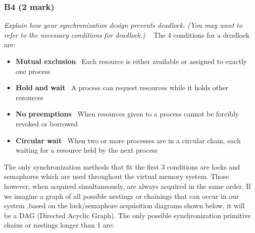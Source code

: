 \documentclass{report}
\newcommand{\question}[1]{\textit{#1} \ }
\newcommand{\bullpara}[2]{\item \textbf{#1} \ #2}
\newcommand{\compitem}[1]{\begin{itemize}\setlength\itemsep{-0.1em}#1\end{itemize}}
\begin{document}
			\subsubsection*{B4 (2 mark)}
				\question{Explain how your synchronization design prevents deadlock.
				(You may want to refer to the necessary conditions for deadlock.)}
				The 4 conditions for a deadlock are:
				\compitem{
					\bullpara{Mutual exclusion}{Each resource is either available or assigned to exactly one process}
					\bullpara{Hold and wait}{A process can request resources while it holds other resources}
					\bullpara{No preemptions}{When resources given to a process cannot be forcibly revoked or borrowed}
					\bullpara{Circular wait}{When two or more processes are in a circular chain, each waiting for a resource held by the next process}
				}
				The only synchronization methods that fit the first 3 conditions are locks and semaphores which are used throughout the virtual memory system.
				Those however, when acquired simultaneously, are always acquired in the same order. If we imagine a graph of all possible
				nestings or chainings that can occur in our system ,based on the lock/semaphore acquisition diagrams shown below, it will be a DAG (Directed Acyclic Graph).
				The only possible synchronization primitive chains or nestings longer than 1  are:
\end{document}
